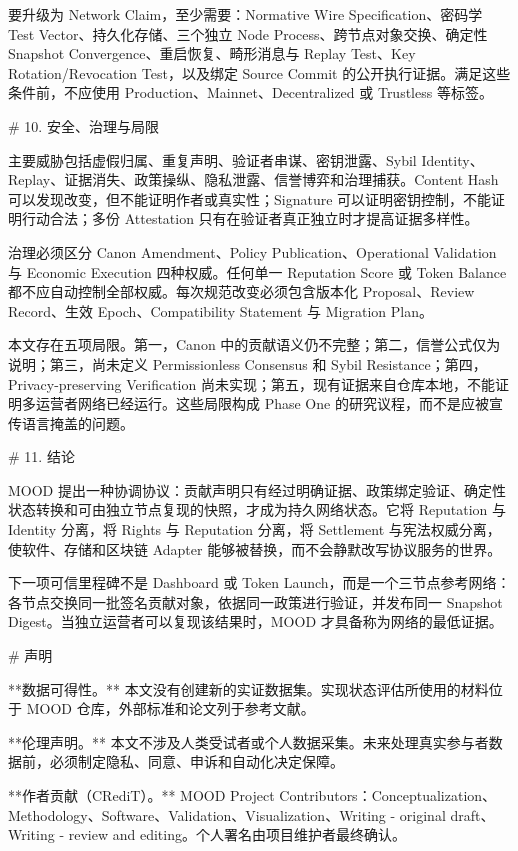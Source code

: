 \documentclass[10pt,a4paper]{article}
\begin{document}
要升级为 Network Claim，至少需要：Normative Wire Specification、密码学 Test Vector、持久化存储、三个独立 Node Process、跨节点对象交换、确定性 Snapshot Convergence、重启恢复、畸形消息与 Replay Test、Key Rotation/Revocation Test，以及绑定 Source Commit 的公开执行证据。满足这些条件前，不应使用 Production、Mainnet、Decentralized 或 Trustless 等标签。

\# 10. 安全、治理与局限

主要威胁包括虚假归属、重复声明、验证者串谋、密钥泄露、Sybil Identity、Replay、证据消失、政策操纵、隐私泄露、信誉博弈和治理捕获。Content Hash 可以发现改变，但不能证明作者或真实性；Signature 可以证明密钥控制，不能证明行动合法；多份 Attestation 只有在验证者真正独立时才提高证据多样性。

治理必须区分 Canon Amendment、Policy Publication、Operational Validation 与 Economic Execution 四种权威。任何单一 Reputation Score 或 Token Balance 都不应自动控制全部权威。每次规范改变必须包含版本化 Proposal、Review Record、生效 Epoch、Compatibility Statement 与 Migration Plan。

本文存在五项局限。第一，Canon 中的贡献语义仍不完整；第二，信誉公式仅为说明；第三，尚未定义 Permissionless Consensus 和 Sybil Resistance；第四，Privacy-preserving Verification 尚未实现；第五，现有证据来自仓库本地，不能证明多运营者网络已经运行。这些局限构成 Phase One 的研究议程，而不是应被宣传语言掩盖的问题。

\# 11. 结论

MOOD 提出一种协调协议：贡献声明只有经过明确证据、政策绑定验证、确定性状态转换和可由独立节点复现的快照，才成为持久网络状态。它将 Reputation 与 Identity 分离，将 Rights 与 Reputation 分离，将 Settlement 与宪法权威分离，使软件、存储和区块链 Adapter 能够被替换，而不会静默改写协议服务的世界。

下一项可信里程碑不是 Dashboard 或 Token Launch，而是一个三节点参考网络：各节点交换同一批签名贡献对象，依据同一政策进行验证，并发布同一 Snapshot Digest。当独立运营者可以复现该结果时，MOOD 才具备称为网络的最低证据。

\# 声明

**数据可得性。** 本文没有创建新的实证数据集。实现状态评估所使用的材料位于 MOOD 仓库，外部标准和论文列于参考文献。

**伦理声明。** 本文不涉及人类受试者或个人数据采集。未来处理真实参与者数据前，必须制定隐私、同意、申诉和自动化决定保障。

**作者贡献（CRediT）。** MOOD Project Contributors：Conceptualization、Methodology、Software、Validation、Visualization、Writing - original draft、Writing - review and editing。个人署名由项目维护者最终确认。
\end{document}
